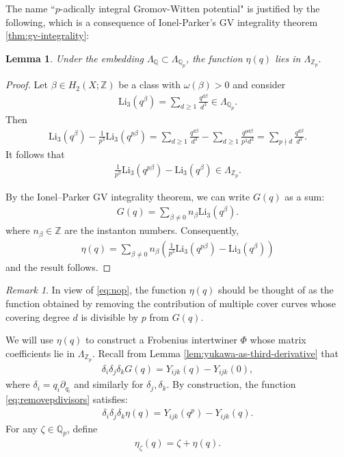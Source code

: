\documentclass[reqno]{amsart}
\numberwithin{equation}{section}
\numberwithin{equation}{section}
\numberwithin{equation}{section}
\newtheorem{lemma}[thm]{Lemma}
\theoremstyle{definition}
\theoremstyle{remark}
\theoremstyle{remark}
\newtheorem{rem}[thm]{Remark}
\begin{document}
 The name ``$p$-adically integral Gromov-Witten potential" is justified by the following, which is a consequence of Ionel-Parker's GV integrality theorem \cref{thm:gv-integrality}:

\begin{lemma} \label{lem:Kontsevichlemma}
Under the embedding $\Lambda_\mathbb{Q} \subset \Lambda_{\mathbb{Q}_p}$, the function $\eta(q)$ lies in $\Lambda_{\mathbb{Z}_p}.$
\end{lemma}
\begin{proof} Let $\beta \in H_2(X;\mathbb{Z})$ be a class with $\omega(\beta)>0$ and consider \begin{align} \mathrm{Li}_3(q^{\beta})=\sum_{d \geq 1} \frac{q^{d\beta}}{d^3} \in \Lambda_{\mathbb{Q}_p}. \end{align} Then \begin{align} \label{eq:nop} \mathrm{Li}_3(q^{\beta})-\frac{1}{p^3}\mathrm{Li}_3(q^{p\beta}) = \sum_{d \geq 1} \frac{q^{d\beta}}{d^3}- \sum_{d \geq 1} \frac{q^{pd\beta}}{p^3d^3} =\sum_{p \nmid d} \frac{q^{d\beta}}{d^3}. \end{align} It follows that \begin{align} \frac{1}{p^3}\mathrm{Li}_3(q^{p\beta})-\mathrm{Li}_3(q^{\beta}) \in \Lambda_{\mathbb{Z}_p}. \end{align}

By the Ionel--Parker GV integrality theorem, we can write $G(q)$ as a sum:
\begin{align} G(q) = \sum_{\beta \neq 0} n_\beta \mathrm{Li}_3(q^\beta).  \end{align}
where $n_\beta \in \mathbb{Z}$ are the instanton numbers. Consequently, \begin{align} \eta(q)= \sum_{\beta  \neq 0} n_\beta \left(\frac{1}{p^3}\mathrm{Li}_3(q^{p\beta})-\mathrm{Li}_3(q^{\beta})\right) \end{align} and the result follows.  
\end{proof}
\begin{rem} In view of \eqref{eq:nop}, the function $\eta(q)$ should be thought of as the function obtained by removing the contribution of multiple cover curves whose covering degree $d$ is divisible by $p$ from $G(q)$.  \end{rem}

We will use $\eta(q)$ to construct a Frobenius intertwiner $\Phi$ whose matrix coefficients lie in $\Lambda_{\mathbb{Z}_p}$. Recall from Lemma \ref{lem:yukawa-as-third-derivative} that
\begin{align} \delta_i \delta_j \delta_k G(q)=Y_{ijk}(q)-Y_{ijk}(0), \end{align} where $\delta_i=q_i\partial_{q_{i}}$ and similarly for $\delta_j,\delta_k$. By construction, the function \eqref{eq:removepdivisors} satisfies: \begin{align} \label{eq:characterizing equation} \delta_i \delta_j \delta_k \eta(q)=Y_{ijk}(q^p)-Y_{ijk}(q). \end{align}
For any $\zeta \in \mathbb{Q}_p$, define \begin{align} \eta_\zeta(q)=\zeta+\eta(q). \end{align}
\end{document}
